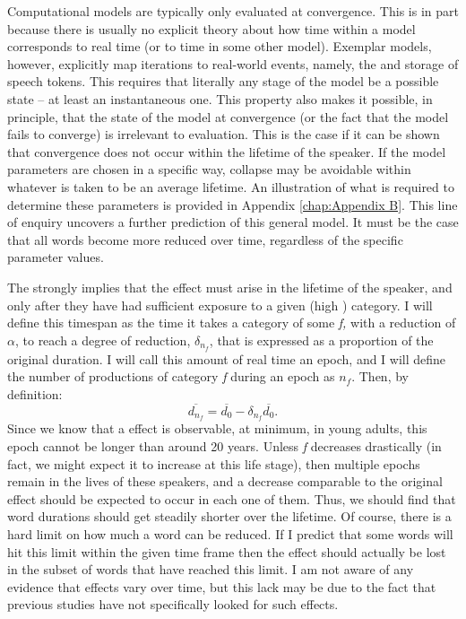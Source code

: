 Computational models are typically only evaluated at convergence.
This is in part because there is usually no explicit theory about
how time within a model corresponds to real time (or to time in some
other model). Exemplar models, however, explicitly map iterations
to real-world events, namely, the  and storage of speech
tokens. This requires that literally any stage of the model be a possible
 state – at least an instantaneous one. This property also
makes it possible, in principle, that the state of the model at convergence
(or the fact that the model fails to converge) is irrelevant to evaluation.
This is the case if it can be shown that convergence does not occur
within the lifetime of the speaker. If the model parameters are chosen
in a specific way, collapse may be avoidable within whatever is taken
to be an average lifetime. An illustration of what is required to
determine these parameters is provided in Appendix \ref{chap:Appendix B}.
This line of enquiry uncovers a further prediction of this general
model. It must be the case that all words become more reduced over
time, regardless of the specific parameter values. 

The  strongly implies that the  effect must
arise in the lifetime of the speaker, and only after they have had
sufficient exposure to a given (high ) category. I will
define this timespan as the time it takes a category of some 
\emph{f,} with a reduction  of $\alpha$, to reach a degree of
reduction, $\delta_{n_{f}}$, that is expressed as a proportion of
the original duration. I will call this amount of real time an epoch,
and I will define the number of productions of category \emph{f}
during an epoch as $n_{f}$. Then, by definition: \[\overline{d_{n_{f}}}=\overline{d_{0}}-\delta_{n_{f}}\overline{d_{0}}\text{.}\]
Since we know that a  effect is observable, at minimum, in
young adults, this epoch cannot be longer than around 20 years. Unless
\emph{f }decreases drastically (in fact, we might expect it to increase
at this life stage), then multiple epochs remain in the lives of these
speakers, and a decrease comparable to the original  effect
should be expected to occur in each one of them. Thus, we should find
that word durations should get steadily shorter over the lifetime.
Of course, there is a hard limit on how much a word can be reduced.
If I predict that some words will hit this limit within the given
time frame then the  effect should actually be lost in the
subset of words that have reached this limit. I am not aware of any evidence
that  effects vary over time, but this lack may be due to the fact that
previous studies have not specifically looked for such effects.


